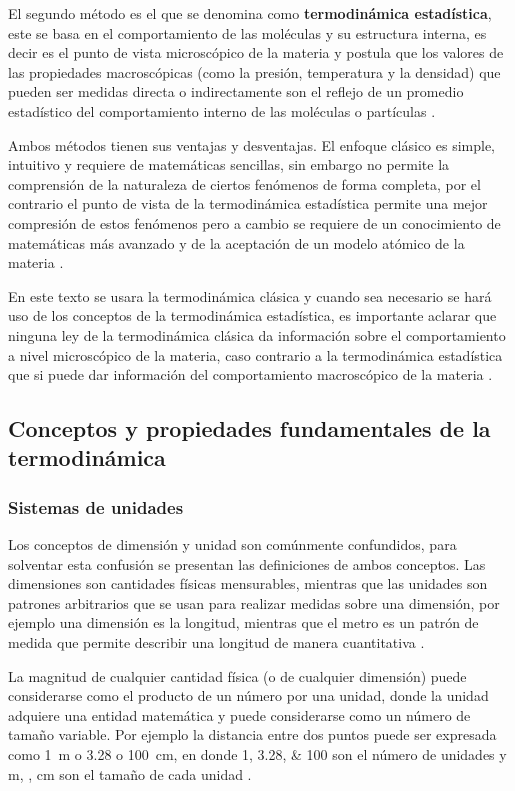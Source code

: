 \documentclass[../master.tex]{subfiles}
\begin{document}
El segundo método es el que se denomina como \textbf{termodinámica estadística}, este se basa en el comportamiento de las moléculas y su estructura interna, es decir es el punto de vista microscópico de la materia y postula que los valores de las propiedades macroscópicas (como la presión, temperatura y la densidad) que pueden ser medidas directa o indirectamente son el reflejo de un promedio estadístico del comportamiento interno de las moléculas o partículas \parencites{faires}{wark}.

Ambos métodos tienen sus ventajas y desventajas. El enfoque clásico es simple, intuitivo y requiere de matemáticas sencillas, sin embargo no permite la comprensión de la naturaleza de ciertos fenómenos de forma completa, por el contrario el punto de vista de la termodinámica estadística permite una mejor compresión de estos fenómenos pero a cambio se requiere de un conocimiento de matemáticas más avanzado y de la aceptación de un modelo atómico de la materia \parencite{faires}.

En este texto se usara la termodinámica clásica y cuando sea necesario se hará uso de los conceptos de la termodinámica estadística, es importante aclarar que ninguna ley de la termodinámica clásica da información sobre el comportamiento a nivel microscópico de la materia, caso contrario a la termodinámica estadística que si puede dar información del comportamiento macroscópico de la materia \parencite{smith-vanness}.

\subsection{Conceptos y propiedades fundamentales de la termodinámica}

\subsubsection{Sistemas de unidades}

Los conceptos de dimensión y unidad son comúnmente confundidos, para solventar esta confusión se presentan las definiciones de ambos conceptos. Las dimensiones son cantidades físicas mensurables, mientras que las unidades son patrones arbitrarios que se usan para realizar medidas sobre una dimensión, por ejemplo una dimensión es la longitud, mientras que el metro es un patrón de medida que permite describir una longitud de manera cuantitativa \parencites{rubenstein}{doran}.


La magnitud de cualquier cantidad física (o de cualquier dimensión) puede considerarse como el producto de un número por una unidad, donde la unidad adquiere una entidad matemática y puede considerarse como un número de tamaño variable. Por ejemplo la distancia entre dos puntos puede ser expresada como \qty{1}{\metre} o \qty{3.28}{\feet} o \qty{100}{\centi\metre}, en donde \numlist{1;3.28;100} son el número de unidades y \unit{m}, \unit{\feet}, \unit{\centi\metre} son el tamaño de cada unidad \parencite{coulson1}.
\end{document}
